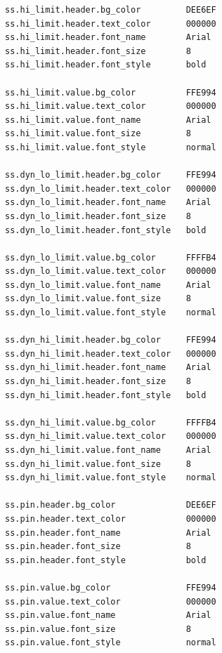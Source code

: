 \documentclass[letterpaper]{article}
\begin{document}
\begin{verbatim}
ss.hi_limit.header.bg_color         DEE6EF
ss.hi_limit.header.text_color       000000
ss.hi_limit.header.font_name        Arial
ss.hi_limit.header.font_size        8
ss.hi_limit.header.font_style       bold

ss.hi_limit.value.bg_color          FFE994
ss.hi_limit.value.text_color        000000
ss.hi_limit.value.font_name         Arial
ss.hi_limit.value.font_size         8
ss.hi_limit.value.font_style        normal

ss.dyn_lo_limit.header.bg_color     FFE994
ss.dyn_lo_limit.header.text_color   000000
ss.dyn_lo_limit.header.font_name    Arial
ss.dyn_lo_limit.header.font_size    8
ss.dyn_lo_limit.header.font_style   bold

ss.dyn_lo_limit.value.bg_color      FFFFB4
ss.dyn_lo_limit.value.text_color    000000
ss.dyn_lo_limit.value.font_name     Arial
ss.dyn_lo_limit.value.font_size     8
ss.dyn_lo_limit.value.font_style    normal

ss.dyn_hi_limit.header.bg_color     FFE994
ss.dyn_hi_limit.header.text_color   000000
ss.dyn_hi_limit.header.font_name    Arial
ss.dyn_hi_limit.header.font_size    8
ss.dyn_hi_limit.header.font_style   bold

ss.dyn_hi_limit.value.bg_color      FFFFB4
ss.dyn_hi_limit.value.text_color    000000
ss.dyn_hi_limit.value.font_name     Arial
ss.dyn_hi_limit.value.font_size     8
ss.dyn_hi_limit.value.font_style    normal

ss.pin.header.bg_color              DEE6EF
ss.pin.header.text_color            000000
ss.pin.header.font_name             Arial
ss.pin.header.font_size             8
ss.pin.header.font_style            bold

ss.pin.value.bg_color               FFE994
ss.pin.value.text_color             000000
ss.pin.value.font_name              Arial
ss.pin.value.font_size              8
ss.pin.value.font_style             normal
\end{verbatim}
\clearpage
\end{document}
